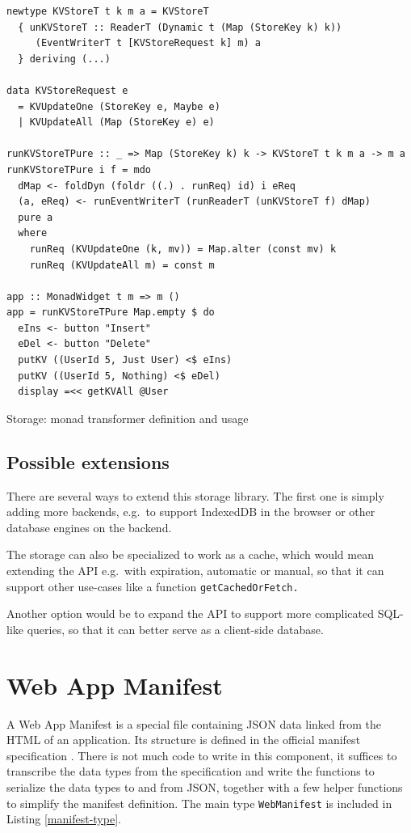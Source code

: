 \documentclass[english,zadani,odsaz]{fitthesis}
\begin{document}
\begin{listing}[tb]
\begin{verbatim}
newtype KVStoreT t k m a = KVStoreT
  { unKVStoreT :: ReaderT (Dynamic t (Map (StoreKey k) k))
     (EventWriterT t [KVStoreRequest k] m) a
  } deriving (...)

data KVStoreRequest e
  = KVUpdateOne (StoreKey e, Maybe e)
  | KVUpdateAll (Map (StoreKey e) e)

runKVStoreTPure :: _ => Map (StoreKey k) k -> KVStoreT t k m a -> m a
runKVStoreTPure i f = mdo
  dMap <- foldDyn (foldr ((.) . runReq) id) i eReq
  (a, eReq) <- runEventWriterT (runReaderT (unKVStoreT f) dMap)
  pure a
  where
    runReq (KVUpdateOne (k, mv)) = Map.alter (const mv) k
    runReq (KVUpdateAll m) = const m

app :: MonadWidget t m => m ()
app = runKVStoreTPure Map.empty $ do
  eIns <- button "Insert"
  eDel <- button "Delete"
  putKV ((UserId 5, Just User) <$ eIns)
  putKV ((UserId 5, Nothing) <$ eDel)
  display =<< getKVAll @User
\end{verbatim}
\caption{Storage: monad transformer definition and usage \label{storage-impl}}
\end{listing}

\subsection{Possible extensions}
\label{sec:orgfd9f625}
There are several ways to extend this storage library. The first one is simply
adding more backends, e.g.~to support IndexedDB in the browser or other
database engines on the backend.

The storage can also be specialized to work as a cache, which would mean
extending the API e.g.~with expiration, automatic or manual, so that it can
support other use-cases like a function \texttt{getCachedOrFetch.}

Another option would be to expand the API to support more complicated SQL-like
queries, so that it can better serve as a client-side database.

\section{Web App Manifest}
\label{sec:org819fd2f}
A Web App Manifest is a special file containing JSON data linked from the HTML
of an application. Its structure is defined in the official manifest
specification \cite{webapp-manifest}. There is not much code to write in this
component, it suffices to transcribe the data types from the specification and
write the functions to serialize the data types to and from JSON, together with
a few helper functions to simplify the manifest definition. The main type
\texttt{WebManifest} is included in Listing \ref{manifest-type}.
\end{document}
